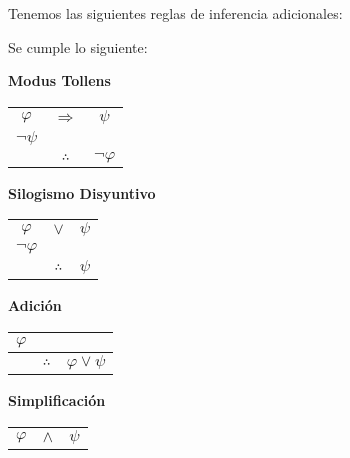 \documentclass[12pt]{report}
\theoremstyle{largebreak}
\begin{document}
    Tenemos las siguientes reglas de inferencia adicionales:

    \begin{propo}
        Se cumple lo siguiente:
        \begin{center}
            \textbf{Modus Tollens}
        \end{center}
        \begin{center}
            \begin{tabular}{c c c}
                $\varphi$ & $\Rightarrow$ & $\psi$ \\
                $\neg\psi$ &  &  \\
                \hline
                 & $\therefore$ & $\neg\varphi$ \\
            \end{tabular}
        \end{center}
        \begin{center}
            \textbf{Silogismo Disyuntivo}
        \end{center}
        \begin{center}
            \begin{tabular}{c c c}
                $\varphi$ & $\lor$ & $\psi$ \\
                $\neg\varphi$ &  &  \\
                \hline
                 & $\therefore$ & $\psi$ \\
            \end{tabular}
        \end{center}
        \begin{center}
            \textbf{Adición}
        \end{center}
        \begin{center}
            \begin{tabular}{c c c}
                $\varphi$ &  &  \\
                \hline
                 & $\therefore$ & $\varphi\lor\psi$ \\
            \end{tabular}
        \end{center}
        \begin{center}
            \textbf{Simplificación}
        \end{center}
        \begin{center}
            \begin{tabular}{c c c}
                $\varphi$ & $\land$ & $\psi$ \\

\end{tabular}
\end{center}
\end{propo}
\end{document}
